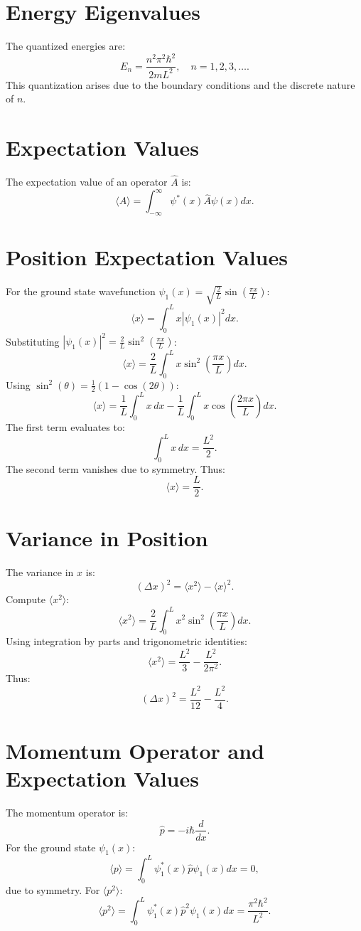 \documentclass[a4paper,12pt]{article}
\begin{document}
\begin{multicols}{2}
\section*{Energy Eigenvalues}
The quantized energies are:
\[
E_n = \frac{n^2 \pi^2 \hbar^2}{2mL^2}, \quad n = 1, 2, 3, \dots.
\]
This quantization arises due to the boundary conditions and the discrete nature of $n$.

\section*{Expectation Values}
The expectation value of an operator $\hat{A}$ is:
\[
\langle A \rangle = \int_{-\infty}^\infty \psi^*(x) \hat{A} \psi(x) dx.
\]

\section*{Position Expectation Values}
For the ground state wavefunction $\psi_1(x) = \sqrt{\frac{2}{L}} \sin\left(\frac{\pi x}{L}\right)$:
\[
\langle x \rangle = \int_0^L x |\psi_1(x)|^2 dx.
\]
Substituting $|\psi_1(x)|^2 = \frac{2}{L} \sin^2\left(\frac{\pi x}{L}\right)$:
\[
\langle x \rangle = \frac{2}{L} \int_0^L x \sin^2\left(\frac{\pi x}{L}\right) dx.
\]
Using $\sin^2(\theta) = \frac{1}{2}(1 - \cos(2\theta))$:
\[
\langle x \rangle = \frac{1}{L} \int_0^L x \, dx - \frac{1}{L} \int_0^L x \cos\left(\frac{2\pi x}{L}\right) dx.
\]
The first term evaluates to:
\[
\int_0^L x \, dx = \frac{L^2}{2}.
\]
The second term vanishes due to symmetry. Thus:
\[
\langle x \rangle = \frac{L}{2}.
\]

\section*{Variance in Position}
The variance in $x$ is:
\[
(\Delta x)^2 = \langle x^2 \rangle - \langle x \rangle^2.
\]
Compute $\langle x^2 \rangle$:
\[
\langle x^2 \rangle = \frac{2}{L} \int_0^L x^2 \sin^2\left(\frac{\pi x}{L}\right) dx.
\]
Using integration by parts and trigonometric identities:
\[
\langle x^2 \rangle = \frac{L^2}{3} - \frac{L^2}{2\pi^2}.
\]
Thus:
\[
(\Delta x)^2 = \frac{L^2}{12} - \frac{L^2}{4}.
\]

\section*{Momentum Operator and Expectation Values}
The momentum operator is:
\[
\hat{p} = -i\hbar \frac{d}{dx}.
\]
For the ground state $\psi_1(x)$:
\[
\langle p \rangle = \int_0^L \psi_1^*(x) \hat{p} \psi_1(x) dx = 0,
\]
due to symmetry. For $\langle p^2 \rangle$:
\[
\langle p^2 \rangle = \int_0^L \psi_1^*(x) \hat{p}^2 \psi_1(x) dx = \frac{\pi^2 \hbar^2}{L^2}.
\]


\end{multicols}
\end{document}
